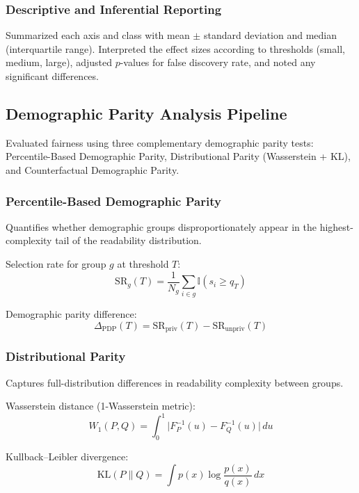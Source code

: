 \subsubsection{Descriptive and Inferential Reporting}
Summarized each axis and class with mean $\pm$ standard deviation and median (interquartile range). Interpreted the effect sizes according to thresholds (small, medium, large), adjusted $p$-values for false discovery rate, and noted any significant differences.

\subsection{Demographic Parity Analysis Pipeline}

Evaluated fairness using three complementary demographic parity tests: Percentile-Based Demographic Parity, Distributional Parity (Wasserstein + KL), and Counterfactual Demographic Parity.

\subsubsection{Percentile-Based Demographic Parity}
Quantifies whether demographic groups disproportionately appear in the highest-complexity tail of the readability distribution.

Selection rate for group $g$ at threshold $T$:
\begin{equation}
    \text{SR}_g(T) = \frac{1}{N_g} \sum_{i \in g} \mathbb{I}\!\left( s_i \ge q_T \right)
\end{equation}

Demographic parity difference:
\begin{equation}
    \Delta_{\mathrm{PDP}}(T) = \text{SR}_{\mathrm{priv}}(T) - \text{SR}_{\mathrm{unpriv}}(T)
\end{equation}

\subsubsection{Distributional Parity}
Captures full-distribution differences in readability complexity between groups.

Wasserstein distance (1-Wasserstein metric):
\begin{equation}
    W_1(P, Q) = \int_{0}^{1} \big| F_P^{-1}(u) - F_Q^{-1}(u) \big| \, du
\end{equation}

Kullback--Leibler divergence:
\begin{equation}
    \mathrm{KL}(P \parallel Q) = \int p(x) \log\frac{p(x)}{q(x)} \, dx
\end{equation}

